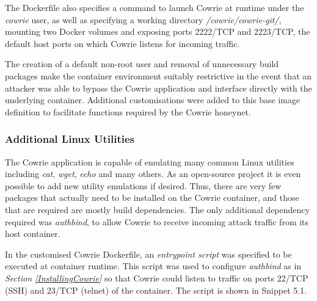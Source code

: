 The Dockerfile also specifies a command to launch Cowrie at runtime under the \textit{cowrie} user, as well as specifying a working directory \textit{/cowrie/cowrie-git/}, mounting two Docker volumes and exposing ports 2222/TCP and 2223/TCP, the default host ports on which Cowrie listens for incoming traffic. 

The creation of a default non-root user and removal of unnecessary build packages make the container environment suitably restrictive in the event that an attacker was able to bypass the Cowrie application and interface directly with the underlying container. Additional customisations were added to this base image definition to facilitate functions required by the Cowrie honeynet.

\subsubsection{Additional Linux Utilities}
The Cowrie application is capable of emulating many common Linux utilities including \textit{cat}, \textit{wget}, \textit{echo} and many others. As an open-source project it is even possible to add new utility emulations if desired. Thus, there are very few packages that actually need to be installed on the Cowrie container, and those that are required are mostly build dependencies. \cite{DockerCowrie} The only additional dependency required was \textit{authbind}, to allow Cowrie to receive incoming attack traffic from its host container. 

In the customised Cowrie Dockerfile, an \textit{entrypoint script} was specified to be executed at container runtime. This script was used to configure \textit{authbind} as in \textit{Section \ref{InstallingCowrie}} so that Cowrie could listen to traffic on ports 22/TCP (SSH) and 23/TCP (telnet) of the container. The script is shown in Snippet 5.1. \mbox{}\\ 
\mbox{}\\
\mbox{}
\linebreak

\label{cowrie_entrypoint_script}


